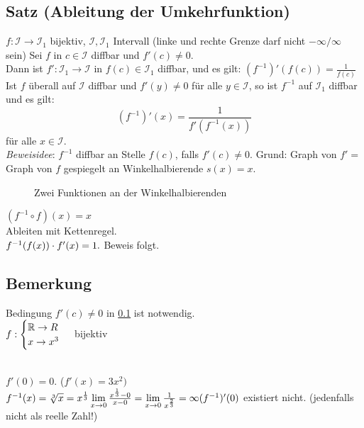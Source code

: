 \subsection{Satz (Ableitung der Umkehrfunktion)}\label{sec:6.12}
$f: \mathcal{I} \to \mathcal{I}_1$ bijektiv, $\mathcal{I},\mathcal{I}_1$ Intervall (linke und rechte Grenze darf nicht $-\infty/\infty$ sein)
Sei $f$ in $c \in \mathcal{I}$ diffbar und $f'(c) \ne 0$.\\
Dann ist $f': \mathcal{I}_1 \to \mathcal{I}$ in $f(c) \in \mathcal{I}_1$ diffbar, und es gilt: $(f^{-1})' (f(c)) = \frac{1}{f(c)}$\\
Ist $f$ überall auf $\mathcal{I}$ diffbar und $f'(y) \ne 0$ für alle $y \in \mathcal{I}$, so ist $f^{-1}$ auf $\mathcal{I}_1$ diffbar und es gilt: \\
\[(f^{-1})'(x) = \frac{1}{f'(f^{-1}(x))} \] für alle $x \in \mathcal{I}$.\\
\emph{Beweisidee}: $f^{-1}$ diffbar an Stelle $f(c)$, falls $f'(c) \ne 0$. Grund: Graph von $f' =$ Graph von $f$ gespiegelt an Winkelhalbierende $s(x) = x.$\\
\begin{figure}[h!]
	\centering
	\caption{Zwei Funktionen an der Winkelhalbierenden}
\end{figure}
$(f^{-1} \circ f)(x) =x$\\
Ableiten mit Kettenregel.\\
$f^{-1}(f(x)) \cdot f'(x) = 1.$ Beweis folgt.
\subsection{Bemerkung}
Bedingung $f'(c) \ne 0$ in \ref{sec:6.12} ist notwendig.\\
$f : \begin{cases}
\mathbb{R} \to R\\
x \to x^3
\end{cases}$ bijektiv \qquad
{}\\
$f'(0) = 0.$ \hfill ($f'(x) =3x^2)$\\
$f^{-1}(x) = \sqrt[3]{x} = x^{\frac{1}{3}}\\
\lim\limits_{x \to 0} \frac{x^{\frac{1}{3}} - 0}{x - 0} = \lim\limits_{x \to 0} \frac{1}{x^{\frac{2}{3}}} = \infty\\
(f^{-1})'(0)$ existiert nicht. (jedenfalls nicht als reelle Zahl!)

